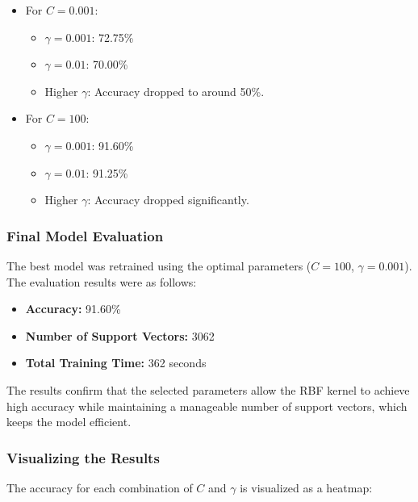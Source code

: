 \documentclass[lettersize,journal]{IEEEtran}
\begin{document}
\begin{itemize}
    \item For $C=0.001$:
        \begin{itemize}
            \item $\gamma=0.001$: 72.75\%
            \item $\gamma=0.01$: 70.00\%
            \item Higher $\gamma$: Accuracy dropped to around 50\%.
        \end{itemize}
    \item For $C=100$:
        \begin{itemize}
            \item $\gamma=0.001$: 91.60\%
            \item $\gamma=0.01$: 91.25\%
            \item Higher $\gamma$: Accuracy dropped significantly.
        \end{itemize}
\end{itemize}

\vspace{0.5cm}

\subsubsection{\textbf{Final Model Evaluation}}
The best model was retrained using the optimal parameters ($C=100$, $\gamma=0.001$). The evaluation results were as follows:
\begin{itemize}
    \item \textbf{Accuracy:} 91.60\%
    \item \textbf{Number of Support Vectors:} 3062
    \item \textbf{Total Training Time:} 362 seconds
\end{itemize}

The results confirm that the selected parameters allow the RBF kernel to achieve high accuracy while maintaining a manageable number of support vectors, which keeps the model efficient.

\vspace{0.5cm}

\subsubsection{\textbf{Visualizing the Results}}
The accuracy for each combination of $C$ and $\gamma$ is visualized as a heatmap:
\end{document}
